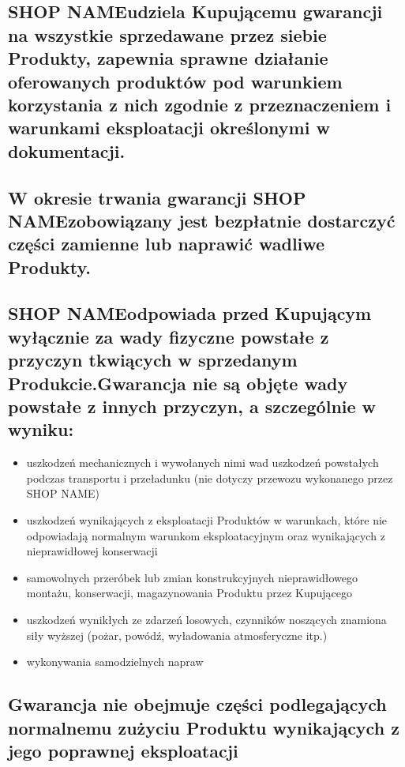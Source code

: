 \documentclass[10pt,a4paper]{article}
\newcommand{\shopname}{SHOP NAME}
\begin{document}
\subsection{\shopname udziela Kupującemu gwarancji na wszystkie sprzedawane przez siebie Produkty, zapewnia sprawne działanie oferowanych
produktów pod warunkiem korzystania z nich zgodnie z przeznaczeniem i warunkami eksploatacji określonymi w dokumentacji.}

\subsection{W okresie trwania gwarancji \shopname zobowiązany jest bezpłatnie dostarczyć części zamienne lub naprawić wadliwe Produkty.}

\subsection{\shopname odpowiada przed Kupującym wyłącznie za wady fizyczne powstałe z przyczyn tkwiących w sprzedanym Produkcie.Gwarancja nie są objęte wady powstałe z innych przyczyn, a szczególnie w wyniku:}

\begin{itemize}

\item uszkodzeń mechanicznych i wywołanych nimi wad
uszkodzeń powstałych podczas transportu i przeładunku (nie dotyczy przewozu wykonanego przez \shopname)
\item uszkodzeń wynikających z eksploatacji Produktów w warunkach, które nie odpowiadają normalnym warunkom eksploatacyjnym oraz
wynikających z nieprawidłowej konserwacji
\item samowolnych przeróbek lub zmian konstrukcyjnych
nieprawidłowego montażu, konserwacji, magazynowania Produktu przez Kupującego
\item uszkodzeń wynikłych ze zdarzeń losowych, czynników noszących znamiona siły wyższej (pożar, powódź, wyładowania atmosferyczne
itp.)
\item wykonywania samodzielnych napraw


\end{itemize}

\subsection{Gwarancja nie obejmuje części podlegających normalnemu zużyciu Produktu wynikających z jego poprawnej eksploatacji}
\end{document}
